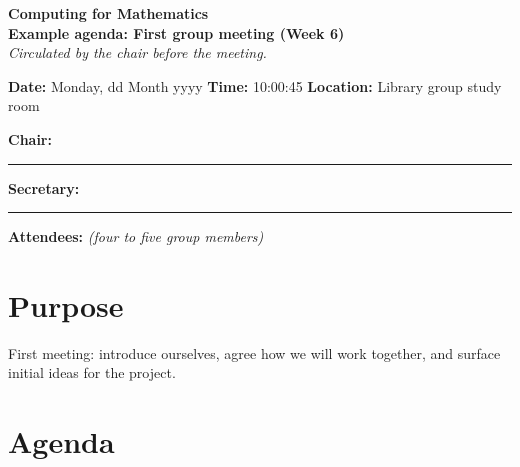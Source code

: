 \documentclass[a4paper,11pt]{article}
\begin{document}
\begin{center}
  {\large\bfseries Computing for Mathematics}\\[0.15em]
  {\bfseries Example agenda: First group meeting (Week 6)}\\[0.2em]
  {\small\itshape Circulated by the chair before the meeting.}
\end{center}

\vspace{0.6em}

\textbf{Date:} Monday, dd Month yyyy \quad
\textbf{Time:} 10:00:45 \quad
\textbf{Location:} Library group study room

\vspace{0.6em}

\textbf{Chair:}~\rule[-0.2em]{9cm}{0.4pt}

\vspace{0.4em}

\textbf{Secretary:}~\rule[-0.2em]{8.5cm}{0.4pt}

\vspace{0.4em}

\textbf{Attendees:} \textit{(four to five group members)}

\section*{Purpose}

First meeting: introduce ourselves, agree how we will work together, and
surface initial ideas for the project.

\section*{Agenda}
\end{document}
